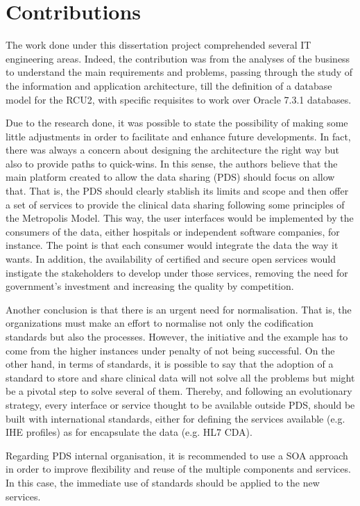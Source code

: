 \section{Contributions}

The work done under this dissertation project comprehended several IT engineering areas. Indeed, the contribution was from the analyses of the business to understand the main requirements and problems, passing through the study of the information and application architecture, till the definition of a database model for the RCU2, with specific requisites to work over Oracle 7.3.1 databases.

Due to the research done, it was possible to state the possibility of making some little adjustments in order to facilitate and enhance future developments. In fact, there was always a concern about designing the architecture the right way but also to provide paths to quick-wins. In this sense, the authors believe that the main platform created to allow the data sharing (PDS) should focus on allow that. That is, the PDS should clearly stablish its limits and scope and then offer a set of services to provide the clinical data sharing following some principles of the Metropolis Model. This way, the user interfaces would be implemented by the consumers of the data, either hospitals or independent software companies, for instance. The point is that each consumer would integrate the data the way it wants. In addition, the availability of certified and secure open services would instigate the stakeholders to develop under those services, removing the need for government's investment and increasing the quality by competition.

Another conclusion is that there is an urgent need for normalisation. That is, the organizations must make an effort to normalise not only the codification standards but also the processes. However, the initiative and the example has to come from the higher instances under penalty of not being successful. On the other hand, in terms of standards, it is possible to say that the adoption of a standard to store and share clinical data will not solve all the problems but might be a pivotal step to solve several of them. Thereby, and following an evolutionary strategy, every interface or service thought to be available outside PDS, should be built with international standards, either for defining the services available (e.g. IHE profiles) as for encapsulate the data (e.g. HL7 CDA).

Regarding PDS internal organisation, it is recommended to use a SOA approach in order to improve flexibility and reuse of the multiple components and services. In this case, the immediate use of standards should be applied to the new services.

